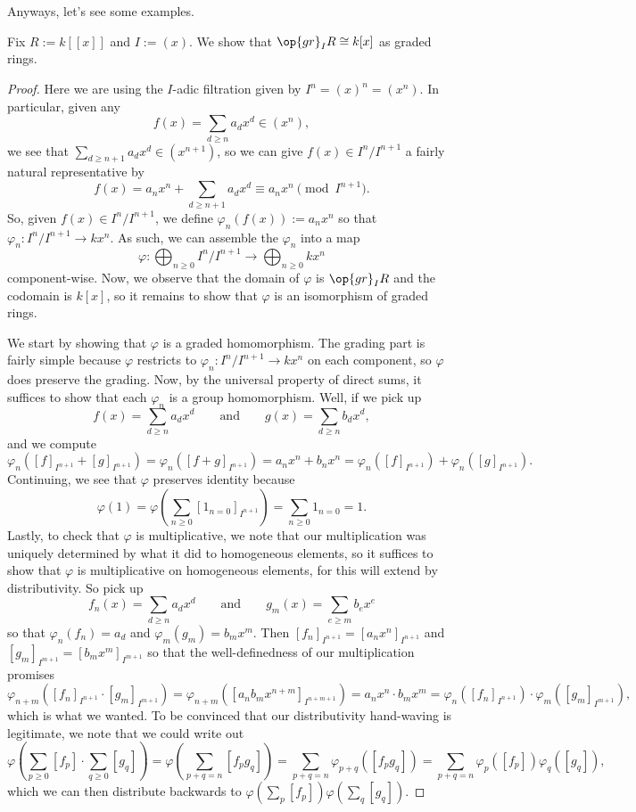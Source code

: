 Anyways, let's see some examples.
\begin{exe}
	Fix $R:=k[[x]]$ and $I:=(x)$. We show that $\op{gr}_IR\cong k[x]$ as graded rings.
\end{exe}
\begin{proof}
	Here we are using the $I$-adic filtration given by $I^n=(x)^n=\left(x^n\right)$. In particular, given any
	\[f(x)=\sum_{d\ge n}a_dx^d\in\left(x^n\right),\]
	we see that $\sum_{d\ge n+1}a_dx^d\in\left(x^{n+1}\right)$, so we can give $f(x)\in I^n/I^{n+1}$ a fairly natural representative by
	\[f(x)=a_nx^n+\sum_{d\ge n+1}a_dx^d\equiv a_nx^n\pmod{I^{n+1}}.\]
	So, given $f(x)\in I^n/I^{n+1}$, we define $\varphi_n(f(x)):=a_nx^n$ so that $\varphi_n:I^n/I^{n+1}\to kx^n$. As such, we can assemble the $\varphi_n$ into a map
	\[\varphi:\bigoplus_{n\ge0}I^n/I^{n+1}\to\bigoplus_{n\ge0}kx^n\]
	component-wise. Now, we observe that the domain of $\varphi$ is $\op{gr}_IR$ and the codomain is $k[x]$, so it remains to show that $\varphi$ is an isomorphism of graded rings.

	We start by showing that $\varphi$ is a graded homomorphism. The grading part is fairly simple because $\varphi$ restricts to $\varphi_n:I^n/I^{n+1}\to kx^n$ on each component, so $\varphi$ does preserve the grading. Now, by the universal property of direct sums, it suffices to show that each $\varphi_n$ is a group homomorphism. Well, if we pick up
	\[f(x)=\sum_{d\ge n}a_dx^d\qquad\text{and}\qquad g(x)=\sum_{d\ge n}b_dx^d,\]
	and we compute
	\[\varphi_n\left([f]_{I^{n+1}}+[g]_{I^{n+1}}\right)=\varphi_n\left([f+g]_{I^{n+1}}\right)=a_nx^n+b_nx^n=\varphi_n\left([f]_{I^{n+1}}\right)+\varphi_n\left([g]_{I^{n+1}}\right).\]
	Continuing, we see that $\varphi$ preserves identity because
	\[\varphi(1)=\varphi\left(\sum_{n\ge0}[1_{n=0}]_{I^{n+1}}\right)=\sum_{n\ge0}1_{n=0}=1.\]
	Lastly, to check that $\varphi$ is multiplicative, we note that our multiplication was uniquely determined by what it did to homogeneous elements, so it suffices to show that $\varphi$ is multiplicative on homogeneous elements, for this will extend by distributivity. So pick up
	\[f_n(x)=\sum_{d\ge n}a_dx^d\qquad\text{and}\qquad g_m(x)=\sum_{e\ge m}b_ex^e\]
	so that $\varphi_n(f_n)=a_d$ and $\varphi_m(g_m)=b_mx^m$. Then $[f_n]_{I^{n+1}}=\left[a_nx^n\right]_{I^{n+1}}$ and $[g_m]_{I^{m+1}}=\left[b_mx^m\right]_{I^{m+1}}$ so that the well-definedness of our multiplication promises
	\[\varphi_{n+m}\left([f_n]_{I^{n+1}}\cdot[g_m]_{I^{m+1}}\right)=\varphi_{n+m}\left([a_nb_mx^{n+m}]_{I^{n+m+1}}\right)=a_nx^n\cdot b_mx^m=\varphi_n\left([f_n]_{I^{n+1}}\right)\cdot\varphi_m\left([g_m]_{I^{m+1}}\right),\]
	which is what we wanted. To be convinced that our distributivity hand-waving is legitimate, we note that we could write out
	\[\varphi\left(\sum_{p\ge0}[f_p]\cdot\sum_{q\ge0}[g_q]\right)=\varphi\left(\sum_{p+q=n}[f_pg_q]\right)=\sum_{p+q=n}\varphi_{p+q}([f_pg_q])=\sum_{p+q=n}\varphi_p([f_p])\varphi_q([g_q]),\]
	which we can then distribute backwards to $\varphi\left(\sum_p[f_p]\right)\varphi\left(\sum_q[g_q]\right)$.


\end{proof}

